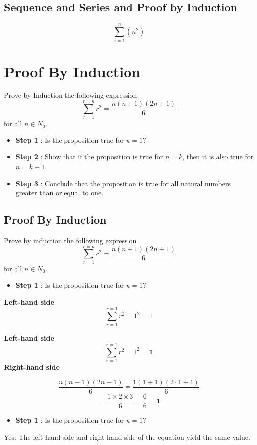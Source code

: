 \documentclass[]{report}
\begin{document}
\subsection{Sequence and Series and Proof by Induction}


\[\sum^{n}_{i=1} (n^2) \]


\section{Proof By Induction}

Prove by Induction the following expression
\[ \sum_{r=1}^{r=n} r^2 = \frac{n(n+1)(2n+1)}{6} \]
for all $n \in N_0$.


\begin{itemize}
	\item \textbf{Step 1} : Is the proposition true for $n = 1$?
	\item \textbf{Step 2} : Show that if the proposition is true for $n=k$, then it is also true for $n=k+1$.
	\item \textbf{Step 3} : Conclude that the proposition is true for all natural numbers greater than or equal to one.
\end{itemize}


\subsection{Proof By Induction}

Prove by induction the following expression
\[ \sum_{r=1}^{r=n} r^2 = \frac{n(n+1)(2n+1)}{6} \]
for all $n \in N_0$.
\begin{itemize}
	\item \textbf{Step 1} : Is the proposition true for $n = 1$? 
\end{itemize}
\textbf{Left-hand side}
\[ \sum_{r=1}^{r=1} r^2 = 1^2 = 1 \]



\textbf{Left-hand side}
\[ \sum_{r=1}^{r=1} r^2 = 1^2 = \boldsymbol{1} \]
\textbf{Right-hand side}

\[ \frac{n(n+1)(2n+1)}{6}  = \frac{1(1+1)(2\cdot 1+1)}{6} \]
\[  = \frac{1\times 2 \times 3}{6} = \frac{6}{6}=\boldsymbol{1} \]



\begin{itemize}
	\item \textbf{Step 1} : Is the proposition true for $n = 1$? 
\end{itemize}
\bigskip
Yes: The left-hand side and right-hand side of the equation yield the same value.
\end{document}

